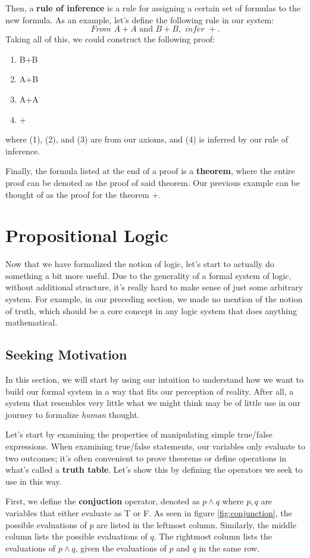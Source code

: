 Then, a \textbf{rule of inference} is a rule for assigning a certain set of formulas to the new formula.
As an example, let's define the following rule in our system:
$$\textit{From } A+A \text{ and } B+B, \textit{ infer } +.$$
Taking all of this, we could construct the following proof:
\begin{enumerate}[label=(\arabic*)]
	\item B+B
	\item A+B
	\item A+A
	\item +
\end{enumerate}
where (1), (2), and (3) are from our axioms, and (4) is inferred by our rule of inference.

Finally, the formula listed at the end of a proof is a \textbf{theorem}, where the entire proof can be denoted as the proof of said theorem.
Our previous example can be thought of as the proof for the theorem $+$.

\section{Propositional Logic}
Now that we have formalized the notion of logic, let's start to actually do something a bit more useful.
Due to the generality of a formal system of logic, without additional structure, it's really hard to make sense of just some arbitrary system.
For example, in our preceding section, we made no mention of the notion of truth, which should be a core concept in any logic system that does anything mathematical.

\subsection{Seeking Motivation}
In this section, we will start by using our intuition to understand how we want to build our formal system in a way that fits our perception of reality.
After all, a system that resembles very little what we might think may be of little use in our journey to formalize \textit{human} thought.

Let's start by examining the properties of manipulating simple true/false expressions.
When examining true/false statements, our variables only evaluate to two outcomes; it's often convenient to prove theorems or define operations in what's called a \textbf{truth table}.
Let's show this by defining the operators we seek to use in this way.

First, we define the \textbf{conjuction} operator, denoted as $p\wedge q$ where $p,q$ are variables that either evaluate as T or F. As seen in figure \eqref{fig:conjunction}, the possible evaluations of $p$ are listed in the leftmost column.
Similarly, the middle column lists the possible evaluations of $q$.
The rightmost column lists the evaluations of $p\wedge q$, given the evaluations of $p$ and $q$ in the same row.

